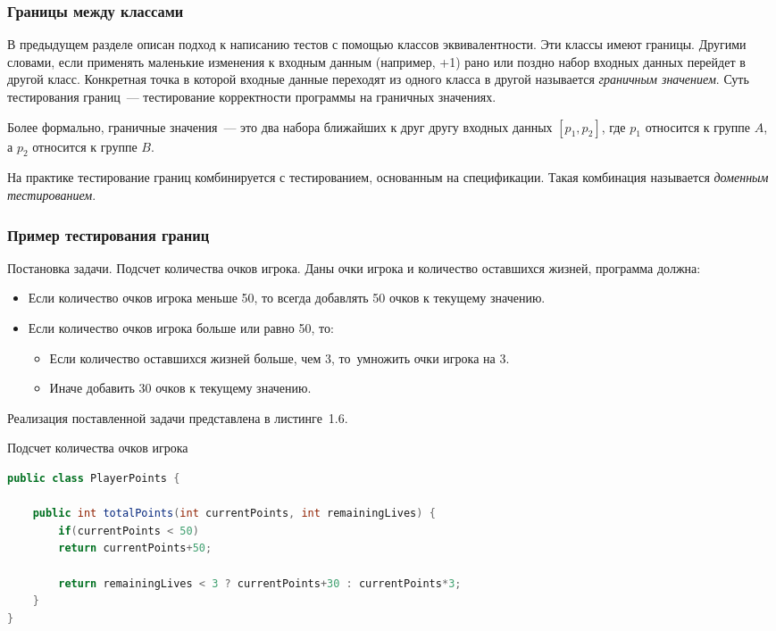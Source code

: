 \subsubsection{Границы между классами} 

В предыдущем разделе описан подход к написанию тестов с помощью классов эквивалентности. Эти классы имеют границы. Другими словами, если применять маленькие изменения к входным данным (например, +1) рано или поздно набор входных данных перейдет в другой класс. Конкретная точка в которой входные данные переходят из одного класса в другой называется \textit{граничным значением}. Суть тестирования границ~--- тестирование корректности программы на граничных значениях. 

Более формально, граничные значения~--- это два набора ближайших к друг другу входных данных \([p_1, p_2]\), где \(p_1\) относится к группе \(A\), а \(p_2\) относится к группе \(B\).
 
На практике тестирование границ комбинируется с тестированием, основанным на спецификации. Такая комбинация называется \textit{доменным тестированием}.
 
\subsubsection{Пример тестирования границ} 

Постановка задачи. Подсчет количества очков игрока. Даны очки игрока и количество оставшихся жизней, программа должна:

\begin{itemize}
	\item Если количество очков игрока меньше 50, то всегда добавлять 50 очков к текущему значению.
	\item Если количество очков игрока больше или равно 50, то:
	\begin{itemize}
		\item Если количество оставшихся жизней больше, чем 3, то~умножить очки игрока на 3.
		\item Иначе добавить 30 очков к текущему значению.
	\end{itemize}
\end{itemize}

Реализация поставленной задачи представлена в листинге~1.6.

\begin{ListingEnv}[!h]%
	\captiondelim{ } %
	\caption{Подсчет количества очков игрока}
	\begin{lstlisting}[language={Java}]
public class PlayerPoints {
	
	public int totalPoints(int currentPoints, int remainingLives) {
		if(currentPoints < 50)
		return currentPoints+50;
		
		return remainingLives < 3 ? currentPoints+30 : currentPoints*3;
	}
}
	\end{lstlisting}
\end{ListingEnv}%

